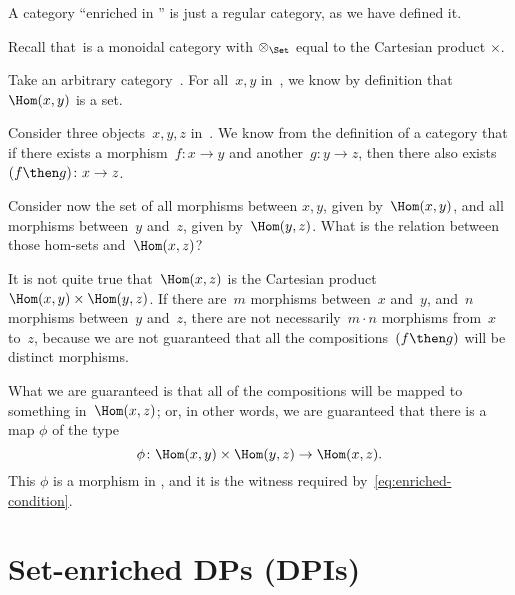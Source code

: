 \begin{example}
    A category ``enriched in \Set'' is just a regular category, as we have defined it.

    Recall that~\Set is a monoidal category with $\otimes_{\Set}$ equal to the Cartesian product $\times$.

    Take an arbitrary category~\CatC. For all~$x, y$ in~\CatC, we know by definition
    that~$\Hom(x,y)$ is a set.

    Consider three objects~$x,y,z$ in~\CatC. We know from the definition of a
    category that if there exists a morphism~$f: x \to y$ and another~$g: y \to z$,
    then there also exists~$(f\then g)\colon x \to z$.

    Consider now the set of all morphisms between $x, y$, given by~$\Hom(x,y)$, and
    all morphisms between~$y$ and~$z$, given by~$\Hom(y, z)$. What is the relation
    between those hom-sets and~$\Hom(x, z)$?

    It is not quite true that~$\Hom(x, z)$ is the Cartesian product~$\Hom(x, y)
    \times \Hom(y, z)$. If there are~$m$ morphisms between~$x$ and~$y$, and~$n$
    morphisms between~$y$ and~$z$, there are not necessarily~$m \cdot n$ morphisms
    from~$x$ to~$z$, because we are not guaranteed that all the compositions~$(f\then g)$
    will be distinct morphisms.

    What we are guaranteed is that all of the compositions will be mapped to something in~$\Hom(x, z)$; or, in other words, we are guaranteed that there
    is a map $\phi$ of the type
    \begin{equation}
        \phi \colon \Hom(x, y) \times \Hom(y, z) \rightarrow \Hom(x, z).
    \end{equation}
    This $\phi$ is a morphism in \Set, and it is the witness required by~\cref{eq:enriched-condition}.

\end{example}


\clearpage


\section{Set-enriched DPs (DPIs)}

